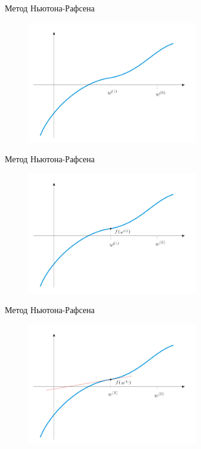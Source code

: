 \documentclass[10pt]{beamer}
\begin{document}
\begin{frame}{Метод Ньютона-Рафсена}
	\begin{figure}[htbp]
	  \includegraphics[height=150pt, keepaspectratio = true]{images/newton-5}   
	\end{figure}
\end{frame}

\begin{frame}{Метод Ньютона-Рафсена}
	\begin{figure}[htbp]
	  \includegraphics[height=150pt, keepaspectratio = true]{images/newton-6}   
	\end{figure}
\end{frame}

\begin{frame}{Метод Ньютона-Рафсена}
	\begin{figure}[htbp]
	  \includegraphics[height=150pt, keepaspectratio = true]{images/newton-7}   
	\end{figure}
\end{frame}
\end{document}
